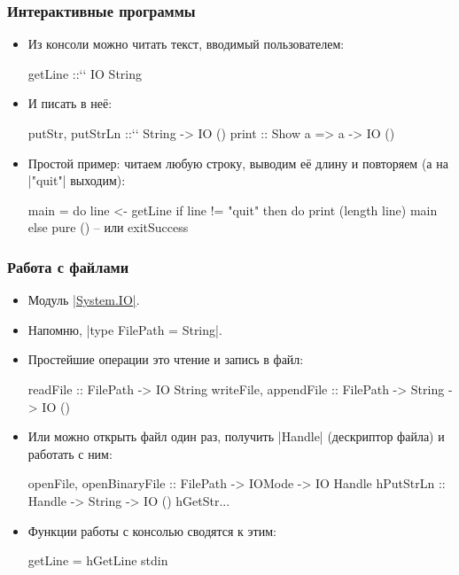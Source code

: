 \documentclass[11pt]{beamer}
\begin{document}
\begin{frame}[fragile]
\frametitle{Интерактивные программы}
\begin{itemize}
    \item Из консоли можно читать текст, вводимый пользователем:
    \begin{haskell}
    getLine ::`\pause` IO String
    \end{haskell}
    \item И писать в неё:    
    \begin{haskell}
    putStr, putStrLn ::`\pause` String -> IO ()
    print :: Show a => a -> IO () 
    \end{haskell}
    \pause
    \item Простой пример: читаем любую строку, выводим её длину и повторяем (а на \haskinline|"quit"| выходим):
    \pause
    \begin{haskell}
    main = do
      line <- getLine
      if line != "quit"
        then do
          print (length line)
          main
        else
          pure ()  -- или exitSuccess
    \end{haskell}    
\end{itemize}
\end{frame}

\begin{frame}[fragile]
\frametitle{Работа с файлами}
\begin{itemize}
    \item Модуль \href{http://hackage.haskell.org/package/base-4.12.0.0/docs/System-IO.html}{\haskinline|System.IO|}.
    \item Напомню, \haskinline|type FilePath = String|.
    \item Простейшие операции это чтение и запись в файл:
    \begin{haskell}
    readFile :: FilePath -> IO String
    writeFile, appendFile :: 
      FilePath -> String -> IO ()
    \end{haskell}
    \item
    Или можно открыть файл один раз, получить \haskinline|Handle| (дескриптор файла) и работать с ним:
    \begin{haskell}
    openFile, openBinaryFile :: 
      FilePath -> IOMode -> IO Handle 
    hPutStrLn :: Handle -> String -> IO ()
    hGetStr...
    \end{haskell}
    \pause
    \item
    Функции работы с консолью сводятся к этим:
    \begin{haskell}
    getLine = hGetLine stdin
    \end{haskell}
\end{itemize}
\end{frame}
\end{document}
